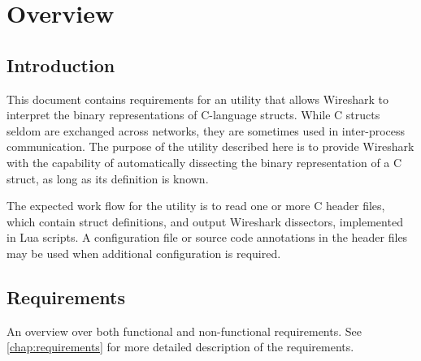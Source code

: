 

\chapter{Overview}

\section{Introduction}
This document contains requirements for an utility that allows Wireshark to
interpret the binary representations of C-language structs. While C structs
seldom are exchanged across networks, they are sometimes used in inter-process
communication. The purpose of the utility described here is to provide
Wireshark with the capability of automatically dissecting the binary
representation of a C struct, as long as its definition is known.

The expected work flow for the utility is to read one or more C header files,
which contain struct definitions, and output Wireshark dissectors, implemented
in Lua scripts. A configuration file or source code annotations in the header
files may be used when additional configuration is required.

\section{Requirements}
An overview over both functional and non-functional requirements.
See \autoref{chap:requirements} for more detailed description of the requirements.

